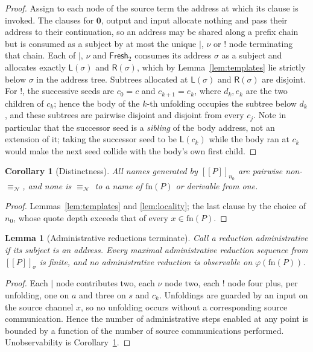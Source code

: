 \documentclass[11pt]{article}
\theoremstyle{definition}
\theoremstyle{plain}
\newtheorem{lemma}[definition]{Lemma}
\newtheorem{corollary}[definition]{Corollary}
\theoremstyle{remark}
\newcommand{\enc}[1]{[\![#1]\!]}
\newcommand{\nequiv}{\equiv_{\mathcal{N}}}
\newcommand{\nil}{\mathbf{0}}
\newcommand{\Lft}{\mathsf{L}}
\newcommand{\Rgt}{\mathsf{R}}
\newcommand{\Frsh}{\mathsf{Fresh}_2}
\newcommand{\fn}{\mathrm{fn}}
\begin{document}
\begin{proof}
Assign to each node of the source term the address at which its clause is
invoked. The clauses for $\nil$, output and input allocate nothing and
pass their address to their continuation, so an address may be shared
along a prefix chain but is consumed as a subject by at most the unique
$\mid$, $\nu$ or $!$ node terminating that chain. Each of $\mid$, $\nu$
and $\Frsh$ consumes its address $\sigma$ as a subject and allocates
exactly $\Lft(\sigma)$ and $\Rgt(\sigma)$, which by
Lemma~\ref{lem:templates} lie strictly below $\sigma$ in the address
tree. Subtrees allocated at $\Lft(\sigma)$ and $\Rgt(\sigma)$ are
disjoint. For $!$, the successive seeds are $c_0 = c$ and
$c_{k+1} = e_k$, where $d_k, e_k$ are the two children of $c_k$; hence
the body of the $k$-th unfolding occupies the subtree below $d_k$, and
these subtrees are pairwise disjoint and disjoint from every $c_j$. Note
in particular that the successor seed is a \emph{sibling} of the body
address, not an extension of it; taking the successor seed to be
$\Lft(c_k)$ while the body ran at $c_k$ would make the next seed collide
with the body's own first child.
\end{proof}

\begin{corollary}[Distinctness]\label{cor:distinct}
All names generated by $\enc{P}_{n_0}$ are pairwise non-$\nequiv$, and
none is $\nequiv$ to a name of $\fn(P)$ or derivable from one.
\end{corollary}

\begin{proof}
Lemmas~\ref{lem:templates} and \ref{lem:locality}; the last clause by the
choice of $n_0$, whose quote depth exceeds that of every $x \in \fn(P)$.
\end{proof}

\begin{lemma}[Administrative reductions terminate]\label{lem:admin}
Call a reduction \emph{administrative} if its subject is an address.
Every maximal administrative reduction sequence from $\enc{P}_\sigma$ is
finite, and no administrative reduction is observable on
$\varphi(\fn(P))$.
\end{lemma}

\begin{proof}
Each $\mid$ node contributes two, each $\nu$ node two, each $!$ node four
plus, per unfolding, one on $a$ and three on $s$ and $c_k$. Unfoldings
are guarded by an input on the source channel $x$, so no unfolding occurs
without a corresponding source communication. Hence the number of
administrative steps enabled at any point is bounded by a function of the
number of source communications performed. Unobservability is
Corollary~\ref{cor:distinct}.
\end{proof}
\end{document}
